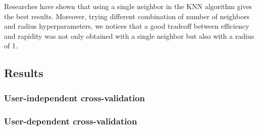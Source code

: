 Researches \cite[text]{keylist} have shown that using a single neighbor in the KNN algorithm gives the best results. Moreover, trying different combination of number of neighbors and radius hyperparameters, we notices that a good tradeoff between efficiency and rapidity was not only obtained with a single neighbor but also with a radius of 1.



\subsection{Results}

\subsubsection{User-independent cross-validation}



\subsubsection{User-dependent cross-validation}